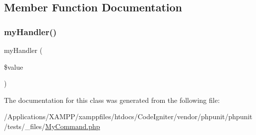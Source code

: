 \subsection{Member Function Documentation}
\mbox{\label{class_my_command_a1e8f6e0626456cd0ea109f06578dc6aa}} 
\subsubsection{\texorpdfstring{my\+Handler()}{myHandler()}}
{\footnotesize\ttfamily my\+Handler (\begin{DoxyParamCaption}\item[{}]{\$value }\end{DoxyParamCaption})}



The documentation for this class was generated from the following file\+:\begin{DoxyCompactItemize}
\item 
/\+Applications/\+X\+A\+M\+P\+P/xamppfiles/htdocs/\+Code\+Igniter/vendor/phpunit/phpunit/tests/\+\_\+files/\mbox{\hyperlink{_my_command_8php}{My\+Command.\+php}}\end{DoxyCompactItemize}
